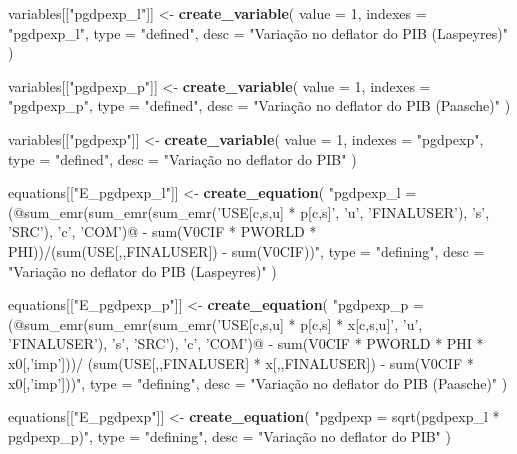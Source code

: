 \documentclass[12pt,twoside]{article}
\newenvironment{Shaded}{\begin{snugshade}}{\end{snugshade}}
\newcommand{\DataTypeTok}[1]{\textcolor[rgb]{0.13,0.29,0.53}{#1}}
\newcommand{\DecValTok}[1]{\textcolor[rgb]{0.00,0.00,0.81}{#1}}
\newcommand{\KeywordTok}[1]{\textcolor[rgb]{0.13,0.29,0.53}{\textbf{#1}}}
\newcommand{\NormalTok}[1]{#1}
\newcommand{\StringTok}[1]{\textcolor[rgb]{0.31,0.60,0.02}{#1}}
\let\oldShaded\Shaded
\let\endoldShaded\endShaded
\renewenvironment{Shaded}{\footnotesize\oldShaded}{\endoldShaded}
\begin{document}
\begin{Shaded}
\begin{Highlighting}[]
\NormalTok{variables[[}\StringTok{"pgdpexp_l"}\NormalTok{]] <-}\StringTok{ }\KeywordTok{create_variable}\NormalTok{(}
  \DataTypeTok{value =} \DecValTok{1}\NormalTok{,}
  \DataTypeTok{indexes =} \StringTok{"pgdpexp_l"}\NormalTok{,}
  \DataTypeTok{type =} \StringTok{"defined"}\NormalTok{,}
  \DataTypeTok{desc =} \StringTok{"Variação no deflator do PIB (Laspeyres)"}
\NormalTok{)}

\NormalTok{variables[[}\StringTok{"pgdpexp_p"}\NormalTok{]] <-}\StringTok{ }\KeywordTok{create_variable}\NormalTok{(}
  \DataTypeTok{value =} \DecValTok{1}\NormalTok{,}
  \DataTypeTok{indexes =} \StringTok{"pgdpexp_p"}\NormalTok{,}
  \DataTypeTok{type =} \StringTok{"defined"}\NormalTok{,}
  \DataTypeTok{desc =} \StringTok{"Variação no deflator do PIB (Paasche)"}
\NormalTok{)}

\NormalTok{variables[[}\StringTok{"pgdpexp"}\NormalTok{]] <-}\StringTok{ }\KeywordTok{create_variable}\NormalTok{(}
  \DataTypeTok{value =} \DecValTok{1}\NormalTok{,}
  \DataTypeTok{indexes =} \StringTok{"pgdpexp"}\NormalTok{,}
  \DataTypeTok{type =} \StringTok{"defined"}\NormalTok{,}
  \DataTypeTok{desc =} \StringTok{"Variação no deflator do PIB"}
\NormalTok{)}

\NormalTok{equations[[}\StringTok{"E_pgdpexp_l"}\NormalTok{]] <-}\StringTok{ }\KeywordTok{create_equation}\NormalTok{(}
  \StringTok{"pgdpexp_l = (@sum_emr(sum_emr(sum_emr('USE[c,s,u] * p[c,s]', 'u', 'FINALUSER'), 's', 'SRC'),}
\StringTok{    'c', 'COM')@ - sum(V0CIF * PWORLD * PHI))/(sum(USE[,,FINALUSER]) - sum(V0CIF))"}\NormalTok{,}
  \DataTypeTok{type =} \StringTok{"defining"}\NormalTok{,}
  \DataTypeTok{desc =} \StringTok{"Variação no deflator do PIB (Laspeyres)"}
\NormalTok{)}

\NormalTok{equations[[}\StringTok{"E_pgdpexp_p"}\NormalTok{]] <-}\StringTok{ }\KeywordTok{create_equation}\NormalTok{(}
  \StringTok{"pgdpexp_p = (@sum_emr(sum_emr(sum_emr('USE[c,s,u] * p[c,s] * x[c,s,u]',}
\StringTok{    'u', 'FINALUSER'), 's', 'SRC'), 'c', 'COM')@ - sum(V0CIF * PWORLD * PHI * x0[,'imp']))/}
\StringTok{    (sum(USE[,,FINALUSER] * x[,,FINALUSER]) - sum(V0CIF * x0[,'imp']))"}\NormalTok{,}
  \DataTypeTok{type =} \StringTok{"defining"}\NormalTok{,}
  \DataTypeTok{desc =} \StringTok{"Variação no deflator do PIB (Paasche)"}
\NormalTok{)}

\NormalTok{equations[[}\StringTok{"E_pgdpexp"}\NormalTok{]] <-}\StringTok{ }\KeywordTok{create_equation}\NormalTok{(}
  \StringTok{"pgdpexp = sqrt(pgdpexp_l * pgdpexp_p)"}\NormalTok{,}
  \DataTypeTok{type =} \StringTok{"defining"}\NormalTok{,}
  \DataTypeTok{desc =} \StringTok{"Variação no deflator do PIB"}
\NormalTok{)}
\end{Highlighting}
\end{Shaded}
\end{document}
